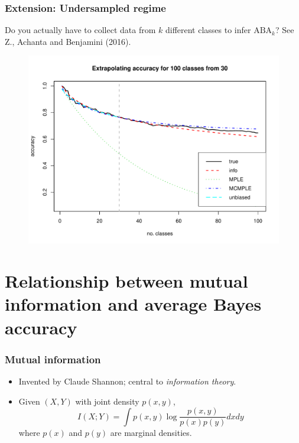 \documentclass{beamer}
\begin{document}
\begin{frame}
\frametitle{Extension: Undersampled regime}
Do you actually have to collect data from $k$ different classes to infer $\text{ABA}_k$?
See Z., Achanta and Benjamini (2016).
\begin{figure}
\centering
\includegraphics[scale = 0.4]{../info_theory_paper/cifar_example.pdf}
\end{figure}
\end{frame}

\section{Relationship between mutual information and average Bayes accuracy}

\begin{frame}
\sectionpage
\end{frame}


\begin{frame}
\frametitle{Mutual information}
\begin{itemize}
\item Invented by Claude Shannon; central to \emph{information theory}.
\item Given $(X, Y)$ with joint density $p(x, y)$,
\[
I(X; Y) = \int p(x, y) \log\frac{p(x, y)}{p(x) p(y)} dx dy
\]
where $p(x)$ and $p(y)$ are marginal densities.
\end{itemize}
\end{frame}
\end{document}
